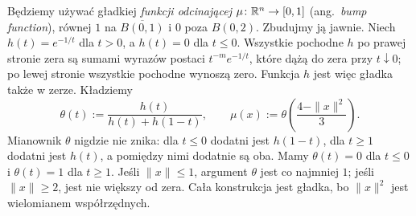 Będziemy używać gładkiej \emph{funkcji odcinającej}
$\mu\colon\mathbb{R}^n\to[0,1]$ (ang.\ \emph{bump function}),
równej $1$ na $\overline{B(0,1)}$ i $0$ poza $B(0,2)$.
Zbudujmy ją jawnie. Niech $h(t)=e^{-1/t}$ dla $t>0$,
a $h(t)=0$ dla $t\leq0$. Wszystkie pochodne $h$ po
prawej stronie zera są sumami wyrazów postaci
$t^{-m}e^{-1/t}$, które dążą do zera przy $t\downarrow0$;
po lewej stronie wszystkie pochodne wynoszą zero.
Funkcja $h$ jest więc gładka także w zerze. Kładziemy
\[
 \theta(t):=\frac{h(t)}{h(t)+h(1-t)},\qquad
 \mu(x):=\theta\!\left(\frac{4-\|x\|^2}{3}\right).
\]
Mianownik $\theta$ nigdzie nie znika: dla $t\leq0$
dodatni jest $h(1-t)$, dla $t\geq1$ dodatni jest $h(t)$,
a pomiędzy nimi dodatnie są oba. Mamy $\theta(t)=0$
dla $t\leq0$ i $\theta(t)=1$ dla $t\geq1$.
Jeśli $\|x\|\leq1$, argument $\theta$ jest co najmniej $1$;
jeśli $\|x\|\geq2$, jest nie większy od zera.
Cała konstrukcja jest gładka, bo $\|x\|^2$ jest
wielomianem współrzędnych.



